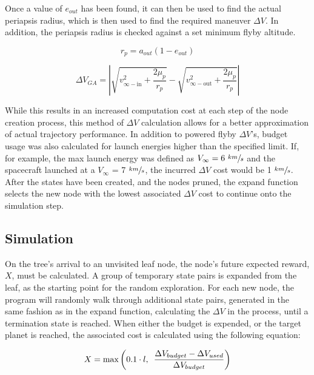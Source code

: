 \documentclass[letterpaper, paper,11pt]{AAS}	%
\begin{document}
Once a value of $e_{out}$ has been found, it can then be used to find the actual periapsis radius, which is then used to find the required maneuver $\Delta V$. In addition, the periapsis radius is checked against a set minimum flyby altitude.

\begin{equation}
    r_p = a_{out}(1 - e_{out})
\end{equation}

\begin{equation}
    \Delta V_{GA} = \left| \sqrt{ v^2_{\infty-\text{in}} + \frac{2\mu_p}{r_p} } - \sqrt{ v^2_{\infty-\text{out}} + \frac{2\mu_p}{r_p} } \right|
\end{equation}

While this results in an increased computation cost at each step of the node creation process, this method of $\Delta V$ calculation allows for a better approximation of actual trajectory performance. In addition to powered flyby $\Delta V$'s, budget usage was also calculated for launch energies higher than the specified limit. If, for example, the max launch energy was defined as $V_\infty = 6 \text{ }\sfrac{km}{s}$ and the spacecraft launched at a $V_\infty$ = 7 $\sfrac{km}{s}$, the incurred $\Delta V$ cost would be 1 $\sfrac{km}{s}$. After the states have been created, and the nodes pruned, the expand function selects the new node with the lowest associated $\Delta V$ cost to continue onto the simulation step.

\subsection{Simulation}

On the tree's arrival to an unvisited leaf node, the node's future expected reward, $X$, must be calculated. A group of temporary state pairs is expanded from the leaf, as the starting point for the random exploration. For each new node, the program will randomly walk through additional state pairs, generated in the same fashion as in the expand function, calculating the $\Delta V$ in the process, until a termination state is reached. When either the budget is expended, or the target planet is reached, the associated cost is calculated using the following equation:

\begin{equation}
    \label{eq:simCost1}
    X = \text{max}\left( 0.1 \cdot l,\hspace{0.5em} \frac{\Delta V_{budget} - \Delta V_{used}}{\Delta V_{budget}} \right)
\end{equation}
\end{document}
